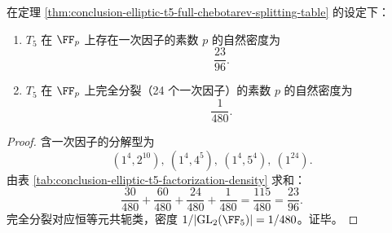 \begin{corollary}[模素数可解性与完全分裂密度]\label{cor:conclusion-elliptic-t5-solvability-and-total-splitting-density}
在定理 \ref{thm:conclusion-elliptic-t5-full-chebotarev-splitting-table} 的设定下：
\begin{enumerate}
  \item \(T_5\) 在 \(\FF_p\) 上存在一次因子的素数 \(p\) 的自然密度为
  \[
  \frac{23}{96}.
  \]
  \item \(T_5\) 在 \(\FF_p\) 上完全分裂（24 个一次因子）的素数 \(p\) 的自然密度为
  \[
  \frac{1}{480}.
  \]
\end{enumerate}
\end{corollary}
\begin{proof}
含一次因子的分解型为
\[
(1^4,2^{10}),\ (1^4,4^5),\ (1^4,5^4),\ (1^{24}).
\]
由表 \ref{tab:conclusion-elliptic-t5-factorization-density} 求和：
\[
\frac{30}{480}+\frac{60}{480}+\frac{24}{480}+\frac{1}{480}
=\frac{115}{480}
=\frac{23}{96}.
\]
完全分裂对应恒等元共轭类，密度 \(1/|\mathrm{GL}_2(\FF_5)|=1/480\)。证毕。
\end{proof}

